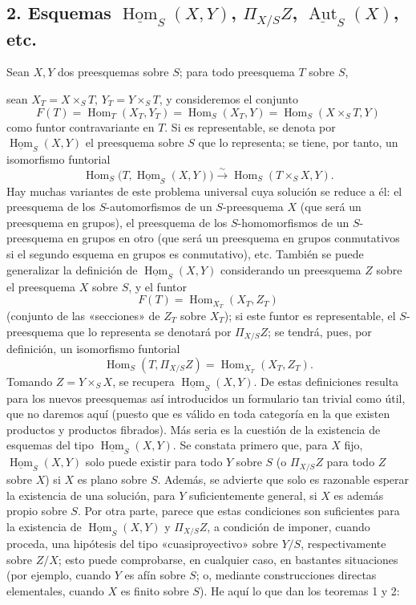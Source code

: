 \subsection*{2. Esquemas $\underline{\operatorname{Hom}}_S(X,Y)$,
$\Pi_{X/S}Z$, $\underline{\operatorname{Aut}}_S(X)$, etc.}

Sean $X,Y$ dos preesquemas sobre $S$; para todo preesquema $T$ sobre $S$,

sean $X_T=X\times_ST$, $Y_T=Y\times_ST$, y consideremos el conjunto
\[
  F(T)=\operatorname{Hom}_T(X_T,Y_T)
      =\operatorname{Hom}_S(X_T,Y)
      =\operatorname{Hom}_S(X\times_ST,Y)
\]
como funtor contravariante en $T$. Si es representable, se denota por
$\underline{\operatorname{Hom}}_S(X,Y)$ el preesquema sobre $S$ que lo
representa; se tiene, por tanto, un isomorfismo funtorial
\[
  \operatorname{Hom}_S
  \bigl(T,\underline{\operatorname{Hom}}_S(X,Y)\bigr)
  \xrightarrow{\sim}
  \operatorname{Hom}_S(T\times_SX,Y).
\]
Hay muchas variantes de este problema universal cuya solución se reduce a él:
el preesquema de los $S$-automorfismos de un $S$-preesquema $X$ (que será un
preesquema en grupos), el preesquema de los $S$-homomorfismos de un
$S$-preesquema en grupos en otro (que será un preesquema en grupos conmutativos
si el segundo esquema en grupos es conmutativo), etc. También se puede
generalizar la definición de $\underline{\operatorname{Hom}}_S(X,Y)$
considerando un preesquema $Z$ sobre el preesquema $X$ sobre $S$, y el funtor
\[
  F(T)=\operatorname{Hom}_{X_T}(X_T,Z_T)
\]
(conjunto de las «secciones» de $Z_T$ sobre $X_T$); si este funtor es
representable, el $S$-preesquema que lo representa se denotará por
$\Pi_{X/S}Z$; se tendrá, pues, por definición, un isomorfismo funtorial
\[
  \operatorname{Hom}_S(T,\Pi_{X/S}Z)
  =\operatorname{Hom}_{X_T}(X_T,Z_T).
\]
Tomando $Z=Y\times_SX$, se recupera
$\underline{\operatorname{Hom}}_S(X,Y)$. De estas definiciones resulta para los
nuevos preesquemas así introducidos un formulario tan trivial como útil, que no
daremos aquí (puesto que es válido en toda categoría en la que existen
productos y productos fibrados). Más seria es la cuestión de la existencia de
esquemas del tipo $\underline{\operatorname{Hom}}_S(X,Y)$. Se constata primero
que, para $X$ fijo, $\underline{\operatorname{Hom}}_S(X,Y)$ solo puede existir
para todo $Y$ sobre $S$ (o $\Pi_{X/S}Z$ para todo $Z$ sobre $X$) si $X$ es plano
sobre $S$. Además, se advierte que solo es razonable esperar la existencia de
una solución, para $Y$ suficientemente general, si $X$ es además propio sobre
$S$. Por otra parte, parece que estas condiciones son suficientes para la
existencia de $\underline{\operatorname{Hom}}_S(X,Y)$ y $\Pi_{X/S}Z$, a
condición de imponer, cuando proceda, una hipótesis del tipo «cuasiproyectivo»
sobre $Y/S$, respectivamente sobre $Z/X$; esto puede comprobarse, en cualquier
caso, en bastantes situaciones (por ejemplo, cuando $Y$ es afín sobre $S$; o,
mediante construcciones directas elementales, cuando $X$ es finito sobre $S$).
He aquí lo que dan los teoremas 1 y 2:

